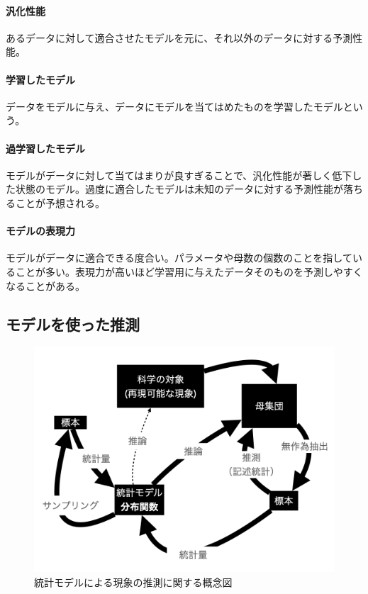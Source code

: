 \paragraph{汎化性能} あるデータに対して適合させたモデルを元に、それ以外のデータに対する予測性能。
\paragraph{学習したモデル}
データをモデルに与え、データにモデルを当てはめたものを学習したモデルという。
\paragraph{過学習したモデル}
モデルがデータに対して当てはまりが良すぎることで、汎化性能が著しく低下した状態のモデル。過度に適合したモデルは未知のデータに対する予測性能が落ちることが予想される。
\paragraph{モデルの表現力}
モデルがデータに適合できる度合い。パラメータや母数の個数のことを指していることが多い。表現力が高いほど学習用に与えたデータそのものを予測しやすくなることがある。

\subsection{モデルを使った推測}



\begin{figure}
 \begin{center}
  \includegraphics[bb=0 0 1024 768,width=15cm]{./image/01_/conceptual_diagram/conceptual_diagram.002.png}
  \caption{統計モデルによる現象の推測に関する概念図}
  \label{fig:conceptual_diagram_statistics}
 \end{center}
\end{figure}




